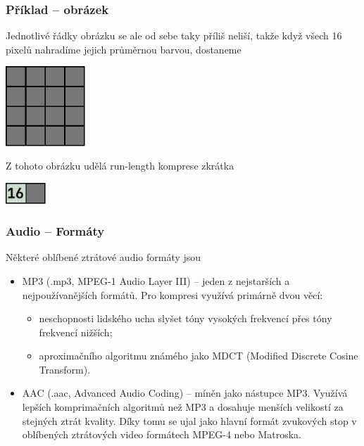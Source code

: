 \documentclass[aspectratio=169,11pt,svgnames,handout]{beamer}
\begin{document}
\begin{frame}
 \frametitle{Příklad -- obrázek}
 Jednotlivé řádky obrázku se ale od sebe taky příliš neliší, takže když všech 16
 pixelů nahradíme jejich průměrnou barvou, dostaneme
 \begin{center}
  \includegraphics[width=3cm]{lossy-4.pdf}
  \vspace*{-.5em}
 \end{center}
 \pause
 Z tohoto obrázku udělá run-length komprese zkrátka
 \begin{center}
  \includegraphics[width=1.5cm]{lossy-5.pdf}
  \vspace*{-.5em}
 \end{center}
\end{frame}

\begin{frame}
 \frametitle{Audio -- Formáty}
 Některé oblíbené \alert{ztrátové} audio formáty jsou
 \begin{itemize}[label=\textbullet]
  \item \alert{MP3} (.mp3, MPEG-1 Audio Layer III) -- jeden z nejstarších a
   nejpoužívanějších formátů. Pro kompresi využívá primárně dvou věcí:
  \begin{itemize}[label=\textemdash]
   \item neschopnosti lidského ucha slyšet tóny vysokých frekvencí přes tóny
    frekvencí nižších;
   \item aproximačního algoritmu známého jako \alert{MDCT} (Modified Discrete
    Cosine Transform).
  \end{itemize}
  \pause
  \item \alert{AAC} (.aac, Advanced Audio Coding) -- míněn jako nástupce MP3.
   Využívá lepších komprimačních algoritmů než MP3 a dosahuje menších velikostí
   za stejných ztrát kvality. Díky tomu se ujal jako hlavní formát zvukových
   stop v oblíbených ztrátových video formátech MPEG-4 nebo Matroska.
 \end{itemize}
\end{frame}
\end{document}
